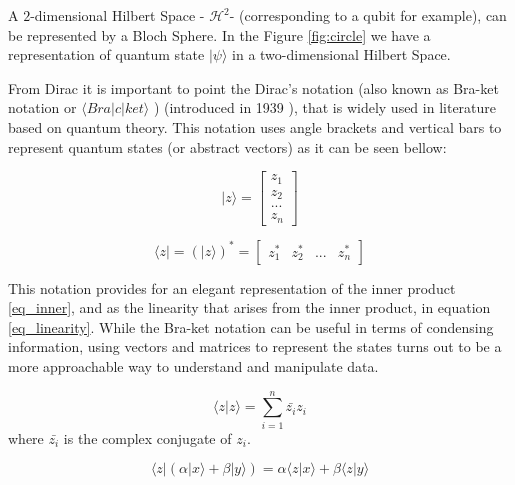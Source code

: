 A $2$-dimensional Hilbert Space - $\mathcal{H}^{2}$- (corresponding to a qubit for example), can be represented by a Bloch Sphere. In the Figure \ref{fig:circle} we have a representation of quantum state $\vert \psi \rangle$ in a two-dimensional Hilbert Space. 


From Dirac it is important to point the Dirac's notation (also known as Bra-ket notation or  $\langle Bra\vert c\vert ket\rangle$ ) (introduced in 1939 \cite{sep-qt-nvd}), that is widely used in literature based on quantum theory. This notation uses angle brackets and vertical bars to represent quantum states (or abstract vectors) as it can be seen bellow: 

\begin{equation}
\label{rangle_dirac}
\vert z\rangle = \left[\begin{array}{c}
z_{1}\\
z_{2}\\
...\\
z_{n}
\end{array}\right]
\end{equation}

\begin{equation}
\label{langle_dirac}
\langle z\vert= ( \vert z\rangle )^*  =\left[\begin{array}{cccc}
z_{1}^{*} & z_{2}^{*} & ... & z_{n}^{*}\end{array}\right]
\end{equation}




This notation provides for an elegant representation of the inner product \eqref{eq_inner}, and as the linearity that arises from the inner product, in equation \eqref{eq_linearity}.
While the Bra-ket notation can be useful in terms of condensing information, using vectors and matrices to represent the states turns out to be a more approachable way to understand and manipulate data.
 

\begin{equation}
\label{eq_inner}
\langle z\vert z\rangle={\displaystyle \sum_{i=1}^{n}\bar{z_{i}}z_{i}}
\end{equation}
where $\bar{z_{i}}$ is the complex conjugate of $z_{i}$.

 

\begin{equation}
\label{eq_linearity}
\langle z\vert(\alpha\vert x\rangle+\beta\vert y\rangle)=\alpha\langle z\vert x\rangle+\beta\langle z\vert y\rangle
\end{equation}




